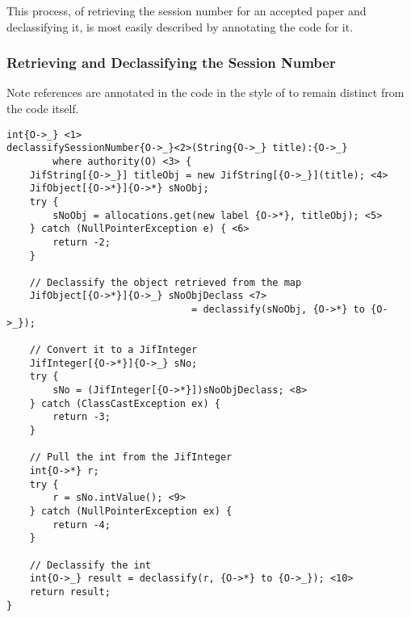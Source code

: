 This process, of retrieving the session number for an accepted paper and declassifying it, is most easily described by annotating the code for it.

\subsubsection{Retrieving and Declassifying the Session Number}
%


Note references are annotated in the code in the style of  to remain distinct from the code itself.

\begin{verbatim}
int{O->_} <1> 
declassifySessionNumber{O->_}<2>(String{O->_} title):{O->_} 
		where authority(O) <3> {
	JifString[{O->_}] titleObj = new JifString[{O->_}](title); <4>
	JifObject[{O->*}]{O->*} sNoObj;
	try {
		sNoObj = allocations.get(new label {O->*}, titleObj); <5>
	} catch (NullPointerException e) { <6>
		return -2;
	}
	
	// Declassify the object retrieved from the map
	JifObject[{O->*}]{O->_} sNoObjDeclass <7> 
								= declassify(sNoObj, {O->*} to {O->_});
	
	// Convert it to a JifInteger
	JifInteger[{O->*}]{O->_} sNo;
	try {
		sNo = (JifInteger[{O->*}])sNoObjDeclass; <8>
	} catch (ClassCastException ex) {
		return -3;
	}
		
	// Pull the int from the JifInteger
	int{O->*} r;
	try {
		r = sNo.intValue(); <9>
	} catch (NullPointerException ex) {
		return -4;
	}
	
	// Declassify the int
	int{O->_} result = declassify(r, {O->*} to {O->_}); <10>
	return result;
}
\end{verbatim}

